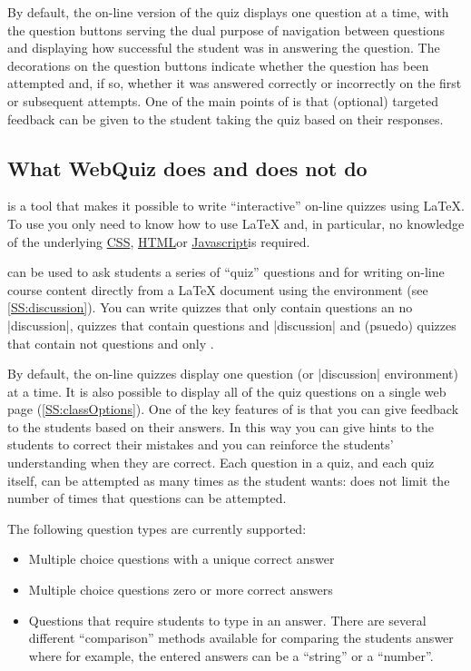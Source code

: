 \documentclass[svgnames]{article}
\newcommand{\HTML}{\href{https://www.w3schools.com/html/html_intro.asp}{HTML}}
\newcommand\CSS{\href{https://www.w3schools.com/css}{CSS}}
\newcommand\Javascript{\href{https://www.w3schools.com/Js/}{Javascript}}
\begin{document}
      By default, the on-line version of the quiz displays one question at
      a time, with the question buttons serving the dual purpose of
      navigation between questions and displaying how successful the
      student was in answering the question. The decorations on the
      question buttons indicate whether the question has been attempted
      and, if so, whether it was answered correctly or incorrectly on the
      first or subsequent attempts. One of the main points of \WebQuiz is
      that (optional) targeted feedback can be given to the student taking
      the quiz based on their responses.

  \subsection{What WebQuiz does and does not do}

      \WebQuiz is a tool that makes it possible to write ``interactive''
      on-line quizzes using \LaTeX{}. To use \WebQuiz you only need to
      know how to use \LaTeX{} and, in particular, no knowledge of the
      underlying \CSS, \HTML or \Javascript is required.

      \WebQuiz can be used to ask students a series of ``quiz'' questions
      and for writing on-line course content directly from a \LaTeX{}
      document using the \WebQuiz {} environment (see
      \autoref{SS:discussion}). You can write \WebQuiz quizzes that only
      contain questions an no \LatexCode|discussion|, quizzes that contain
      questions and \LatexCode|discussion| and (psuedo) quizzes that
      contain not questions and only .

      By default, the on-line quizzes display one question (or
      \LatexCode|discussion| environment) at a time.  It is also possible
      to display all of the quiz questions on a single web page
      (\autoref{SS:classOptions}). One of the key features of \WebQuiz is
      that you can give feedback to the students based on their answers.
      In this way you can give hints to the students to correct their
      mistakes and you can reinforce the students' understanding when they
      are correct. Each question in a quiz, and each quiz itself, can be
      attempted as many times as the student wants: \WebQuiz does not
      limit the number of times that questions can be attempted.

      The following question types are currently supported:
      \begin{itemize}
        \item Multiple choice questions with a unique correct answer
        \item Multiple choice questions zero or more correct answers
        \item Questions that require students to type in an answer. There
        are several different ``comparison'' methods available for
        comparing the students answer where
        for example, the entered answers can be a ``string'' or a ``number''.
      \end{itemize}
\end{document}
